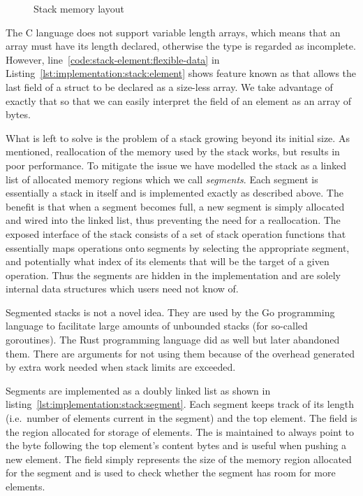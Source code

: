 \begin{figure}[H]
  \centering
  
  \caption{Stack memory layout}
  \label{fig:implementation:stack-layout}
\end{figure}

The C language does not support variable length arrays, which means that an
array must have its length declared, otherwise the type is regarded as
incomplete. However, line~\ref{code:stack-element:flexible-data} in
Listing~\ref{lst:implementation:stack:element} shows feature known as
 that allows the last field of a struct to be declared as a
size-less array. We take advantage of exactly that so that we can easily
interpret the  field of an element as an array of bytes.

What is left to solve is the problem of a stack growing beyond its initial
size. As mentioned, reallocation of the memory used by the stack works, but
results in poor performance. To mitigate the issue we have modelled the stack as
a linked list of allocated memory regions which we call \textit{segments}. Each
segment is essentially a stack in itself and is implemented exactly as described
above. The benefit is that when a segment becomes full, a new segment is simply
allocated and wired into the linked list, thus preventing the need for a
reallocation. The exposed interface of the stack consists of a set of stack
operation functions that essentially maps operations onto segments by selecting
the appropriate segment, and potentially what index of its elements that will be
the target of a given operation. Thus the segments are hidden in the
implementation and are solely internal data structures which users need not know
of.

\begin{remark}
  Segmented stacks is not a novel idea. They are used by the Go programming
  language to facilitate large amounts of unbounded stacks (for so-called
  goroutines). The Rust programming language did as well but later abandoned
  them. There are arguments for not using them because of the overhead generated
  by extra work needed when stack limits are
  exceeded\cite{rust:segmented-stack, go:segmented-stack}.
\end{remark}

Segments are implemented as a doubly linked list as shown in
listing~\ref{lst:implementation:stack:segment}. Each segment keeps track of its
length (i.e.~number of elements current in the segment) and the top element. The
 field is the region allocated for storage of elements. The
 is maintained to always point to the byte following the top
element's content bytes and is useful when pushing a new element. The
 field simply represents the size of the memory region allocated for
the segment and is used to check whether the segment has room for more elements.

